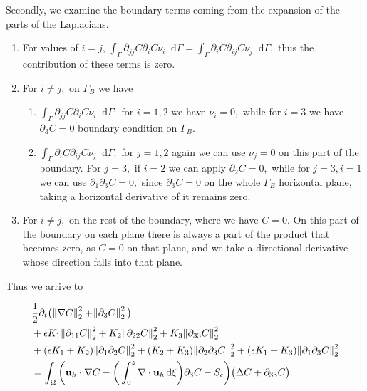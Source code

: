 \documentclass[11pt]{article}
\newcommand*\diff{\mathop{}\!\mathrm{d}}
\begin{document}
Secondly, we examine the boundary terms coming from the expansion of the parts of the Laplacians.

\begin{enumerate}
  \item For values of $i=j$, $\int_\Gamma \partial_{jj} C \partial_i C \nu_i \diff \Gamma = \int_\Gamma \partial_i C \partial_{ij} C \nu_j \diff \Gamma,$ thus the contribution of these terms is zero.
  \item For $i \neq j,$ on $\Gamma_B$ we have
  \begin{enumerate}
    \item $\int_\Gamma \partial_{jj} C \partial_i C \nu_i \diff \Gamma:$ for $i = 1,2$ we have $\nu_i = 0,$ while for $i=3$ we have $\partial_3 C = 0$ boundary condition on $\Gamma_B.$
    \item $\int_\Gamma \partial_i C \partial_{ij} C \nu_j \diff \Gamma:$ for $j = 1,2$ again we can use $\nu_j = 0$ on this part of the boundary. For $j = 3,$ if $i=2$ we can apply $\partial_2 C = 0,$ while for $j=3, i= 1$ we can use $\partial_1 \partial_3 C = 0,$ since $\partial_3 C = 0$ on the whole $\Gamma_B$ horizontal plane, taking a horizontal derivative of it remains zero.
  \end{enumerate}
  \item For $i \neq j,$ on the rest of the boundary, where we have $C = 0.$ On this part of the boundary on each plane there is always a part of the product that becomes zero, as $C=0$ on that plane, and we take a directional derivative whose direction falls into that plane.
\end{enumerate}

Thus we arrive to

\begin{equation}
  \begin{split}
    &\frac{1}{2} \partial_t \big( \norm{\nabla C}_2^2 + \norm{\partial_3 C}^2_2 \big) \\
    & + \epsilon K_1 \norm{\partial_{11} C}^2_2 + K_2 \norm{\partial_{22} C}^2_2 + K_3 \norm{\partial_{33} C}^2_2 \\
    & + (\epsilon K_1 + K_2) \norm{\partial_1 \partial_2 C}_2^2 + (K_2 + K_3) \norm{\partial_2 \partial_3 C}_2^2 + (\epsilon K_1 + K_3) \norm{\partial_1 \partial_3 C}_2^2 \\
    & = \int_\Omega \bigg ( \mathbf{u}_h \cdot \nabla C - \bigg( \int_0^z \nabla \cdot \mathbf{u}_h \diff \xi \bigg) \partial_3 C - S_\epsilon \bigg ) \big( \Delta C + \partial_{33} C \big).
  \end{split}
\end{equation}
\end{document}
